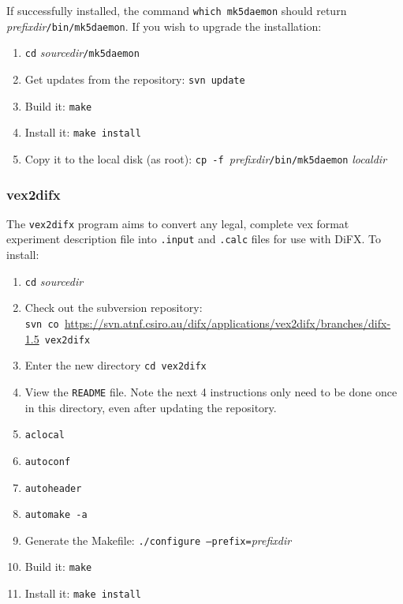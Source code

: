 If successfully installed, the command {\tt which mk5daemon} should return {\em prefixdir}{\tt /bin/mk5daemon}.
If you wish to upgrade the installation:
\begin{enumerate}
\item {\tt cd} {\em sourcedir}{\tt /mk5daemon}
\item Get updates from the repository: {\tt svn update}
\item Build it: {\tt make}
\item Install it: {\tt make install}
\item Copy it to the local disk (as root): {\tt cp -f }{\em prefixdir}{\tt /bin/mk5daemon} {\em localdir}
\end{enumerate}









\subsubsection{vex2difx}

The {\tt vex2difx} program aims to convert any legal, complete vex format experiment description file into {\tt .input} and {\tt .calc} files for use with DiFX.
To install:
\begin{enumerate}
\item {\tt cd} {\em sourcedir}
\item Check out the subversion repository: \\
{\tt svn co }\url{https://svn.atnf.csiro.au/difx/applications/vex2difx/branches/difx-1.5}{\tt\ vex2difx}
\item Enter the new directory {\tt cd vex2difx}
\item View the {\tt README} file.  
Note the next 4 instructions only need to be done once in this directory, even after updating the repository.
\item {\tt aclocal}
\item {\tt autoconf}
\item {\tt autoheader}
\item {\tt automake -a}
\item Generate the Makefile: {\tt ./configure --prefix=}{\em prefixdir}
\item Build it: {\tt make}
\item Install it: {\tt make install}
\end{enumerate}

